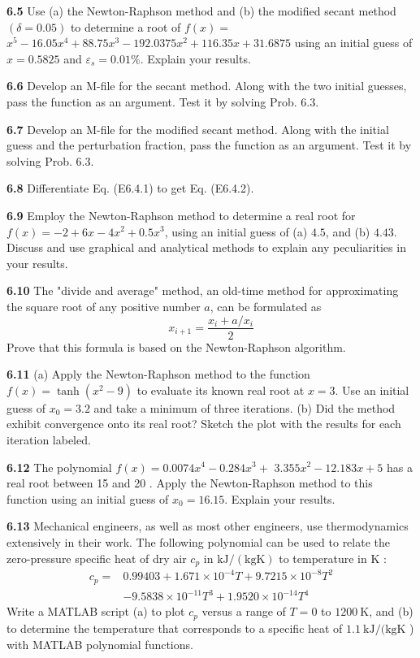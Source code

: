 \documentclass[../main.tex]{subfiles}
\begin{document}
\begin{multicols}{2}
    \noindent \textbf{6.5}  Use (a) the Newton-Raphson method and (b) the modified secant method $(\delta=0.05)$ to determine a root of $f(x)=$ $x^{5}-16.05 x^{4}+88.75 x^{3}-192.0375 x^{2}+116.35 x+31.6875$
    using an initial guess of $x=0.5825$ and $\varepsilon_{s}=0.01 \%$. Explain your results.
    
    \noindent \textbf{6.6} Develop an M-file for the secant method. Along with the two initial guesses, pass the function as an argument. Test it by solving Prob. $6.3$.
    
    \noindent \textbf{6.7}  Develop an M-file for the modified secant method. Along with the initial guess and the perturbation fraction, pass the function as an argument. Test it by solving Prob. 6.3.
    
    \noindent \textbf{6.8}  Differentiate Eq. (E6.4.1) to get Eq. (E6.4.2).
    
    \noindent \textbf{6.9}  Employ the Newton-Raphson method to determine a real root for $f(x)=-2+6 x-4 x^{2}+0.5 x^{3}$, using an initial guess of (a) $4.5$, and (b) $4.43$. Discuss and use graphical and analytical methods to explain any peculiarities in your results.

    \noindent \textbf{6.10} The "divide and average" method, an old-time method for approximating the square root of any positive number $a$, can be formulated as
    $$
    x_{i+1}=\frac{x_{i}+a / x_{i}}{2}
    $$
    Prove that this formula is based on the Newton-Raphson algorithm.
    
    \noindent \textbf{6.11} (a) Apply the Newton-Raphson method to the function $f(x)=\tanh \left(x^{2}-9\right)$ to evaluate its known real root at $x=3$. Use an initial guess of $x_{0}=3.2$ and take a minimum of three iterations. (b) Did the method exhibit convergence onto its real root? Sketch the plot with the results for each iteration labeled.
    
    \noindent \textbf{6.12} The polynomial $f(x)=0.0074 x^{4}-0.284 x^{3}+$ $3.355 x^{2}-12.183 x+5$ has a real root between 15 and 20 . Apply the Newton-Raphson method to this function using an initial guess of $x_{0}=16.15$. Explain your results.
    
    \noindent \textbf{6.13} Mechanical engineers, as well as most other engineers, use thermodynamics extensively in their work. The following polynomial can be used to relate the zero-pressure specific heat of dry air $c_{p}$ in $\mathrm{kJ} /(\mathrm{kg} \mathrm{K})$ to temperature in $\mathrm{K}$ :
    $$
    \begin{aligned}
    c_{p}=& 0.99403+1.671 \times 10^{-4} T+9.7215 \times 10^{-8} T^{2} \\
    &-9.5838 \times 10^{-11} T^{3}+1.9520 \times 10^{-14} T^{4}
    \end{aligned}
    $$
    Write a MATLAB script (a) to plot $c_{p}$ versus a range of $T=0$ to $1200 \mathrm{~K}$, and (b) to determine the temperature that corresponds to a specific heat of $1.1 \mathrm{~kJ} /(\mathrm{kg} \mathrm{K}$ ) with MATLAB polynomial functions.
    

\end{multicols}
\end{document}
